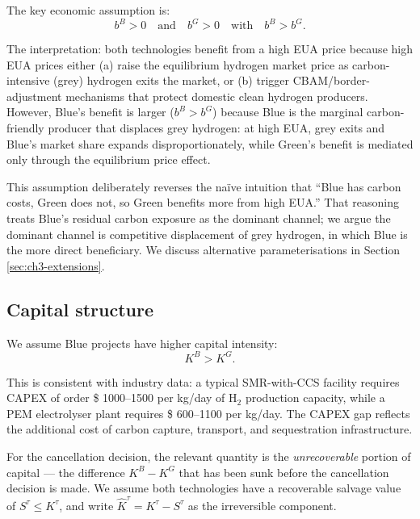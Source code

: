 The key economic assumption is:
\begin{equation}
b^B > 0 \quad \text{and} \quad b^G > 0 \quad \text{with} \quad b^B > b^G.
\label{eq:ch3-key-assumption}
\end{equation}

The interpretation: both technologies benefit from a high EUA price because high EUA prices either (a) raise the equilibrium hydrogen market price as carbon-intensive (grey) hydrogen exits the market, or (b) trigger CBAM/border-adjustment mechanisms that protect domestic clean hydrogen producers. However, Blue's benefit is larger ($b^B > b^G$) because Blue is the marginal carbon-friendly producer that displaces grey hydrogen: at high EUA, grey exits and Blue's market share expands disproportionately, while Green's benefit is mediated only through the equilibrium price effect.

This assumption deliberately reverses the naïve intuition that ``Blue has carbon costs, Green does not, so Green benefits more from high EUA.'' That reasoning treats Blue's residual carbon exposure as the dominant channel; we argue the dominant channel is competitive displacement of grey hydrogen, in which Blue is the more direct beneficiary. We discuss alternative parameterisations in Section \ref{sec:ch3-extensions}.

\subsection{Capital structure}

We assume Blue projects have higher capital intensity:
\begin{equation}
K^B > K^G.
\label{eq:ch3-capital}
\end{equation}

This is consistent with industry data: a typical SMR-with-CCS facility requires CAPEX of order \$ 1000--1500 per kg/day of H$_2$ production capacity, while a PEM electrolyser plant requires \$ 600--1100 per kg/day. The CAPEX gap reflects the additional cost of carbon capture, transport, and sequestration infrastructure.

For the cancellation decision, the relevant quantity is the \textit{unrecoverable} portion of capital --- the difference $K^B - K^G$ that has been sunk before the cancellation decision is made. We assume both technologies have a recoverable salvage value of $S^{\tau} \leq K^{\tau}$, and write $\hat{K}^{\tau} = K^{\tau} - S^{\tau}$ as the irreversible component.

